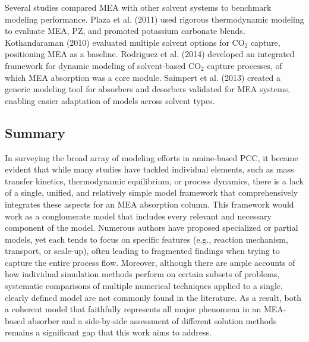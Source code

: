 \documentclass[a4paper,fleqn]{cas-sc}
\begin{document}
    Several studies compared MEA with other solvent systems to benchmark modeling performance. Plaza et al. (2011) \cite{Plaza2011ModelingCommittee} used rigorous thermodynamic modeling to evaluate MEA, PZ, and promoted potassium carbonate blends. Kothandaraman (2010) \cite{AnushaKothandaramanChemEng2010CarbonStudy} evaluated multiple solvent options for CO$_2$ capture, positioning MEA as a baseline. Rodriguez et al. (2014) \cite{Rodriguez2014} developed an integrated framework for dynamic modeling of solvent-based CO$_2$ capture processes, of which MEA absorption was a core module. Saimpert et al. (2013) \cite{Saimpert2013ATool} created a generic modeling tool for absorbers and desorbers validated for MEA systems, enabling easier adaptation of models across solvent types.

    \subsection{Summary}

    In surveying the broad array of modeling efforts in amine-based PCC, it became evident that while many studies have tackled individual elements, such as mass transfer kinetics, thermodynamic equilibrium, or process dynamics, there is a lack of a single, unified, and relatively simple model framework that comprehensively integrates these aspects for an MEA absorption column. This framework would work as a conglomerate model that includes every relevant and necessary component of the model. Numerous authors have proposed specialized or partial models, yet each tends to focus on specific features (e.g., reaction mechanism, transport, or scale-up), often leading to fragmented findings when trying to capture the entire process flow. Moreover, although there are ample accounts of how individual simulation methods perform on certain subsets of problems, systematic comparisons of multiple numerical techniques applied to a single, clearly defined model are not commonly found in the literature. As a result, both a coherent model that faithfully represents all major phenomena in an MEA-based absorber and a side-by-side assessment of different solution methods remains a significant gap that this work aims to address.
\end{document}
